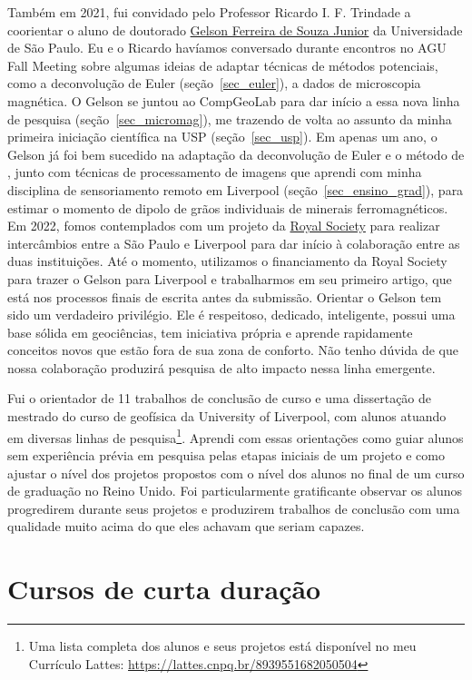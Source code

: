 \documentclass[12pt,a4paper,oneside]{book}
\newcommand{\Lattes}{8939551682050504}
\newcommand{\USP}{Universidade de São Paulo}
\newcommand{\UoL}{University of Liverpool}
\newcommand{\GelsonLink}{\href{https://www.compgeolab.org/team/\#Souza-junior}{Gelson Ferreira de Souza Junior}}
\begin{document}
Também em 2021, fui convidado pelo Professor Ricardo I. F. Trindade a
coorientar o aluno de doutorado \GelsonLink{} da \USP{}.
Eu e o Ricardo havíamos conversado durante encontros no AGU Fall Meeting sobre
algumas ideias de adaptar técnicas de métodos potenciais, como a deconvolução
de Euler (seção~\ref{sec_euler}), a dados de microscopia magnética.
O Gelson se juntou ao CompGeoLab para dar início a essa nova linha de pesquisa
(seção~\ref{sec_micromag}), me trazendo de volta ao assunto da minha primeira
iniciação científica na USP (seção~\ref{sec_usp}).
Em apenas um ano, o Gelson já foi bem sucedido na adaptação da deconvolução de
Euler e o método de \citet{OliveiraJr2015}, junto com técnicas de processamento
de imagens que aprendi com minha disciplina de sensoriamento remoto em
Liverpool (seção~\ref{sec_ensino_grad}), para estimar o momento de dipolo
de grãos individuais de minerais ferromagnéticos.
Em 2022, fomos contemplados com um projeto da
\href{https://royalsociety.org/}{Royal Society} para realizar intercâmbios
entre a São Paulo e Liverpool para dar início à colaboração entre as duas
instituições.
Até o momento, utilizamos o financiamento da Royal Society para trazer o Gelson
para Liverpool e trabalharmos em seu primeiro artigo, que está nos processos
finais de escrita antes da submissão.
Orientar o Gelson tem sido um verdadeiro privilégio.
Ele é respeitoso, dedicado, inteligente, possui uma base sólida em geociências,
tem iniciativa própria e aprende rapidamente conceitos novos que estão fora de
sua zona de conforto.
Não tenho dúvida de que nossa colaboração produzirá pesquisa de alto impacto
nessa linha emergente.

Fui o orientador de 11 trabalhos de conclusão de curso e uma dissertação de
mestrado do curso de geofísica da \UoL{}, com alunos
atuando em diversas linhas de pesquisa\footnote{Uma lista completa dos alunos
e seus projetos está disponível no meu Currículo Lattes: \url{https://lattes.cnpq.br/\Lattes}}.
Aprendi com essas orientações como guiar alunos sem experiência prévia em
pesquisa pelas etapas iniciais de um projeto e como ajustar o nível dos
projetos propostos com o nível dos alunos no final de um curso de graduação no
Reino Unido.
Foi particularmente gratificante observar os alunos progredirem durante seus
projetos e produzirem trabalhos de conclusão com uma qualidade muito acima do
que eles achavam que seriam capazes.


\section{Cursos de curta duração}
\label{sec_workshops}
\end{document}
